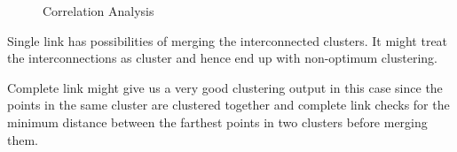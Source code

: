 \documentclass[paper=a4, fontsize=11pt]{scrartcl}
\numberwithin{equation}{section}		%
\numberwithin{figure}{section}			%
\numberwithin{table}{section}				%
\begin{document}
\begin{figure}[H]
  \centering
  \hfill
  \caption*{Correlation Analysis}
\end{figure}

Single link has possibilities of merging the interconnected clusters. It might treat the interconnections as cluster and hence end up with non-optimum clustering.

Complete link might give us a very good clustering output in this case since the points in the same cluster are clustered together and complete link checks for the minimum distance between the farthest points in two clusters before merging them.
\end{document}
